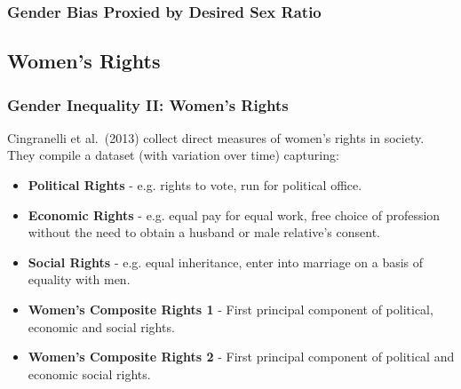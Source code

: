 \documentclass[10pt,letterpaper,subeqn]{beamer}
\begin{document}
\begin{frame}[label=DSRanalysis]
\frametitle{Gender Bias Proxied by Desired Sex Ratio} 

\end{frame}

\subsection{Women's Rights}


\begin{frame}[label=WomensRights]
\frametitle{Gender Inequality II: Women's Rights}
Cingranelli et al.\ (2013) collect direct measures of women's rights in society.  They compile a dataset (with variation over time) capturing: \vspace{4mm}
\begin{itemize}
		\item \textbf{Political Rights} - e.g. rights to vote, run for political office.
		\item \textbf{Economic Rights} - e.g. equal pay for equal work, free choice of profession without the need to obtain a husband or male relative's consent.
		\item \textbf{Social Rights} - e.g. equal inheritance, enter into marriage on a basis of equality with men.
		\item \textbf{Women's Composite Rights 1} - First principal component of political, economic and social rights.
		\item \textbf{Women's Composite Rights 2} - First principal component of political and economic social rights.
\end{itemize}

\end{frame}

\end{document}

